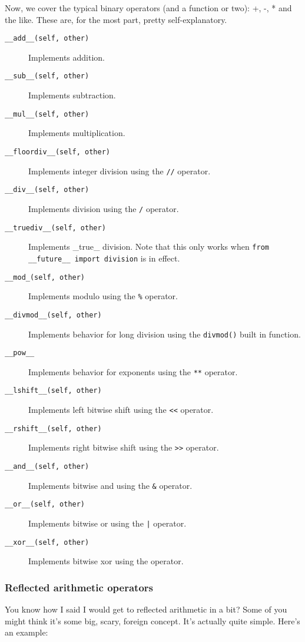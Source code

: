 \documentclass[a4paper,11pt]{article}
\newcommand{\code}[1]{\texttt{#1}}
\begin{document}
Now, we cover the typical binary operators (and a function or two): +, -, * and the like. These are, for the most part, pretty self-explanatory.

\begin{description}

\item[\code{__add__(self, other)}]
Implements addition.
\item[\code{__sub__(self, other)}]
Implements subtraction.
\item[\code{__mul__(self, other)}]
Implements multiplication.
\item[\code{__floordiv__(self, other)}]
Implements integer division using the \code{//} operator.
\item[\code{__div__(self, other)}]
Implements division using the \code{/} operator.
\item[\code{__truediv__(self, other)}]
Implements _true_ division. Note that this only works when \code{from __future__ import division} is in effect.
\item[\code{__mod_(self, other)}]
Implements modulo using the \code{\%} operator.
\item[\code{__divmod__(self, other)}]
Implements behavior for long division using the \code{divmod()} built in function.
\item[\code{__pow__}]
Implements behavior for exponents using the \code{**} operator.
\item[\code{__lshift__(self, other)}]
Implements left bitwise shift using the \code{<<} operator.
\item[\code{__rshift__(self, other)}]
Implements right bitwise shift using the \code{>>} operator.
\item[\code{__and__(self, other)}]
Implements bitwise and using the \code{\&} operator.
\item[\code{__or__(self, other)}]
Implements bitwise or using the \code{|} operator.
\item[\code{__xor__(self, other)}]
Implements bitwise xor using the \code{} operator.

\end{description}

\subsubsection{Reflected arithmetic operators}

You know how I said I would get to reflected arithmetic in a bit? Some of you might think it's some big, scary, foreign concept. It's actually quite simple. Here's an example:
\end{document}

